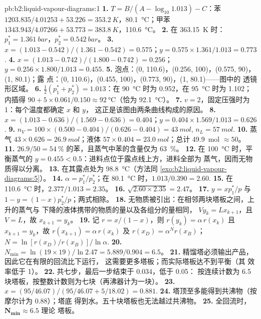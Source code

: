 \begin{solution}{pb:b2:liquid-vapour-diagrams:1}
\textbf{1.} $T = B/(A - \log_{10}1.013) - C$：苯 $1203.835/4.01253 + 53.226 =
\qty{353.2}{K}$，\qty{80.1}{\degreeCelsius}；甲苯 $1343.943/4.07266 + 53.773 =
\qty{383.8}{K}$，\qty{110.6}{\degreeCelsius}。
\textbf{2.} 在 \qty{363.15}{K} 时：$p_1^* = \qty{1.361}{bar}$，$p_2^* = \qty{0.542}{bar}$。
\textbf{3.} $x = (1.013 - 0.542)/(1.361 - 0.542) = 0.575$；$y = 0.575 \times
1.361/1.013 = 0.773$.
\textbf{4.} $x = (1.013 - 0.742)/(1.800 - 0.742) = 0.256$；$y = 0.256 \times
1.800/1.013 = 0.455$.
\textbf{5.} 泡点：(0, 110.6)，(0.256, 100)，(0.575, 90)，(1, 80.1)；露
点：(0, 110.6)，(0.455, 100)，(0.773, 90)，(1, 80.1)——图中的
透镜形区域。
\textbf{6.} $\frac12(p_1^* + p_2^*) = 1.013$：在 \qty{90}{\degreeCelsius} 时为 0.952，在
\qty{95}{\degreeCelsius} 时为 1.102；内插得 $90 + 5 \times 0.061/0.150 \approx
\qty{92}{\degreeCelsius}$（恰为 \qty{92.1}{\degreeCelsius}）。
\textbf{7.} $v = 2$，固定压强时为 1：每个温度都确定 $x$ 和 $y$，
这正是该图由两条曲线构成的原因。
\textbf{8.} $x = (1.013 - 0.636)/(1.569 - 0.636) = 0.404$；$y = 0.404 \times
1.569/1.013 = 0.626$.
\textbf{9.} $n_V = 100 \times (0.500 - 0.404)/(0.626 - 0.404) = \qty{43}{mol}$,
$n_L = \qty{57}{mol}$.
\textbf{10.} 蒸气 $43 \times 0.626 = \qty{26.9}{mol}$；液体 $57 \times 0.404
= \qty{23.0}{mol}$；总计 \qty{49.9}{mol} $\approx 50$。
\textbf{11.} $26.9/50 = 54~\%$ 的苯，且蒸气中苯的含量仅为 63~\%。
\textbf{12.} 在 \qty{100}{\degreeCelsius} 时，平衡蒸气的 $y =
0.455 < 0.5$：进料点位于露点线上方，进料全部为
蒸气，因而无物质得以分离。
\textbf{13.} 在其露点处为 \qty{98.8}{\degreeCelsius}（方法同
\cref{exo:b2:liquid-vapour-diagrams:5}）。
\textbf{14.} $\alpha = p_1^*/p_2^*$；在 \qty{80.1}{\degreeCelsius} 时，$1.013/0.390 =
2.60$.
\textbf{15.} 在 \qty{110.6}{\degreeCelsius} 时，$2.377/1.013 = 2.35$。
\textbf{16.} $\sqrt{2.60 \times 2.35} = 2.47$。
\textbf{17.} $y = xp_1^*/p$ 与 $1 - y = (1 - x)p_2^*/p$；两式相除。
\textbf{18.} 无物质被引出：在相邻两块塔板之间，上升的蒸气与
下降的液体携带的物质的量以及各组分的量相同，
$V y_k = L x_{k+1}$，且 $V = L$，故 $x_{k+1} = y_k$。
\textbf{19.} 记 $r = x/(1 - x)$，则 $r(y_k) = \alpha\,r(x_k)$ 且 $x_{k+1} = y_k$，故
$r(x_{k+1}) = \alpha\,r(x_k)$ 及 $r(x_D) = \alpha^N r(x_B)$；$N = \ln[r(x_D)/
r(x_B)]/\ln\alpha$.
\textbf{20.} $N_{\min} = \ln(19 \times 19)/\ln 2.47 = 5.889/0.904 = 6.5$。
\textbf{21.} 精馏塔必须输出产品，因此它在有限的回流比下运行，
这需要更多塔板；而实际塔板达不到平衡（其
效率低于 1）。
\textbf{22.} 共七步，最后一步结束于 0.034，低于 0.05：
按连续计数为 6.5 块塔板，按整数计数则为七块（再沸器计为一块）。
\textbf{23.} $x = (95/46.07)/(95/46.07 + 5/18.02) = 0.881$.
\textbf{24.} 塔顶至多能得到共沸物（按摩尔计为 0.88）；塔底
得到水。五十块塔板也无法越过共沸物。
\textbf{25.} 全回流时，$\boldsymbol{N_{\min} \approx 6.5}$ 理论
塔板。
\end{solution}
